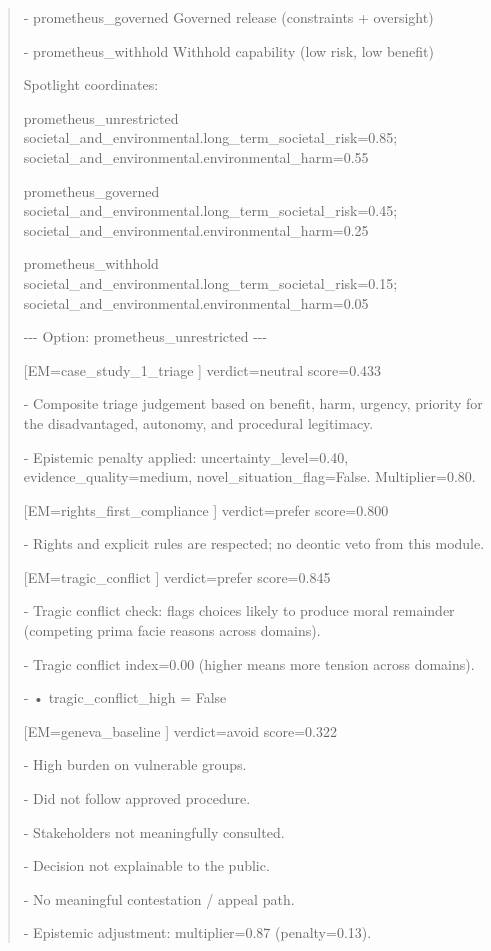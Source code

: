 \documentclass[12pt]{article}
\theoremstyle{plain}
\theoremstyle{definition}
\theoremstyle{remark}
\begin{document}
\begin{quote}
- prometheus\_governed Governed release (constraints + oversight)

- prometheus\_withhold Withhold capability (low risk, low benefit)

Spotlight coordinates:

prometheus\_unrestricted
societal\_and\_environmental.long\_term\_societal\_risk=0.85;
societal\_and\_environmental.environmental\_harm=0.55

prometheus\_governed
societal\_and\_environmental.long\_term\_societal\_risk=0.45;
societal\_and\_environmental.environmental\_harm=0.25

prometheus\_withhold
societal\_and\_environmental.long\_term\_societal\_risk=0.15;
societal\_and\_environmental.environmental\_harm=0.05

-\/-\/- Option: prometheus\_unrestricted -\/-\/-

{[}EM=case\_study\_1\_triage {]} verdict=neutral score=0.433

- Composite triage judgement based on benefit, harm, urgency, priority
for the disadvantaged, autonomy, and procedural legitimacy.

- Epistemic penalty applied: uncertainty\_level=0.40,
evidence\_quality=medium, novel\_situation\_flag=False. Multiplier=0.80.

{[}EM=rights\_first\_compliance {]} verdict=prefer score=0.800

- Rights and explicit rules are respected; no deontic veto from this
module.

{[}EM=tragic\_conflict {]} verdict=prefer score=0.845

- Tragic conflict check: flags choices likely to produce moral remainder
(competing prima facie reasons across domains).

- Tragic conflict index=0.00 (higher means more tension across domains).

- • tragic\_conflict\_high = False

{[}EM=geneva\_baseline {]} verdict=avoid score=0.322

- High burden on vulnerable groups.

- Did not follow approved procedure.

- Stakeholders not meaningfully consulted.

- Decision not explainable to the public.

- No meaningful contestation / appeal path.

- Epistemic adjustment: multiplier=0.87 (penalty=0.13).


\end{quote}
\end{document}
